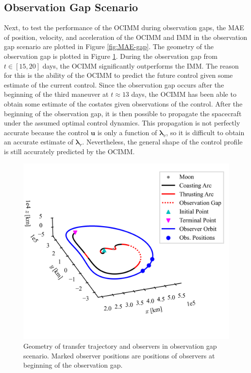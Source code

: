 \documentclass[letterpaper, preprint, paper,11pt]{AAS}	%
\begin{document}
\subsection{Observation Gap Scenario}

Next, to test the performance of the OCIMM during observation gaps, the MAE of position, velocity, and acceleration of the OCIMM and IMM in the observation gap scenario are plotted in Figure \ref{fig:MAE-gap}. The geometry of the observation gap is plotted in Figure \ref{fig:unobserved_trajectory}. During the observation gap from $t \in [15, 20]$ days, the OCIMM significantly outperforms the IMM. The reason for this is the ability of the OCIMM to predict the future control given some estimate of the current control. Since the observation gap occurs after the beginning of the third maneuver at $t \approx 13$ days, the OCIMM has been able to obtain some estimate of the costates given observations of the control. After the beginning of the observation gap, it is then possible to propagate the spacecraft under the assumed optimal control dynamics. This propagation is not perfectly accurate because the control $\bm{u}$ is only a function of $\bm{\lambda}_v$, so it is difficult to obtain an accurate estimate of $\bm{\lambda}_r$. Nevertheless, the general shape of the control profile is still accurately predicted by the OCIMM.

\begin{figure}
    \centering
    \includegraphics[width=0.5\linewidth]{Figures/unobserved_trajectory.png}
    \caption{Geometry of transfer trajectory and observers in observation gap scenario. Marked observer positions are positions of observers at beginning of the observation gap.}
    \label{fig:unobserved_trajectory}
\end{figure}
\end{document}
